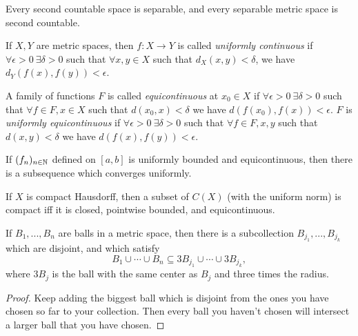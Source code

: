 \documentclass[letterpaper,11pt]{report}
\begin{document}
\begin{prop} Every second countable space is separable, and every separable metric space is second countable.
\end{prop}

\begin{defn} If $X,Y$ are metric spaces, then $f:X \rightarrow Y$ is called \emph{uniformly continuous} if $\forall \epsilon > 0\ \exists \delta > 0$ such that $\forall x,y \in X$ such that $d_X(x,y) < \delta$, we have $d_Y(f(x),f(y)) < \epsilon$.
\end{defn}

\begin{defn} A family of functions $F$ is called \emph{equicontinuous} at $x_0 \in X$ if $\forall \epsilon > 0\ \exists \delta > 0$ such that $\forall f \in F, x \in X$ such that $d(x_0,x) < \delta$ we have $d(f(x_0),f(x)) < \epsilon$. $F$ is \emph{uniformly equicontinuous} if $\forall \epsilon > 0\ \exists \delta > 0$ such that $\forall f \in F, x,y$ such that $d(x,y) < \delta$ we have $d(f(x),f(y)) < \epsilon$.
\end{defn}

\begin{thm} If $(f_n)_{n \in \mathbb{N}}$ defined on $[a,b]$ is uniformly bounded and equicontinuous, then there is a subsequence which converges uniformly.
\end{thm}

\begin{thm} If $X$ is compact Hausdorff, then a subset of $C(X)$ (with the uniform norm) is compact iff it is closed, pointwise bounded, and equicontinuous.
\end{thm}

\begin{lem}\label{finite-vitali} If $B_1, ..., B_n$ are balls in a metric space, then there is a subcollection $B_{j_1}, ..., B_{j_k}$ which are disjoint, and which satisfy
\[
B_1 \cup \cdots \cup B_n \subseteq 3B_{j_1} \cup \cdots \cup 3B_{j_k},
\]
where $3B_j$ is the ball with the same center as $B_j$ and three times the radius.
\end{lem}
\begin{proof} Keep adding the biggest ball which is disjoint from the ones you have chosen so far to your collection. Then every ball you haven't chosen will intersect a larger ball that you have chosen.
\end{proof}
\end{document}
